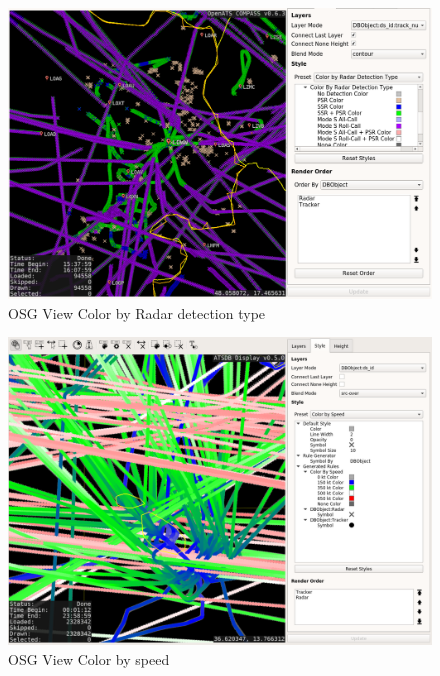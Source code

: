 \begin{figure}[H]
    \hspace*{-2.5cm}
    \includegraphics[width=19cm,frame]{figures/osgview_style_radar_detection_type.png}
  \caption{OSG View Color by Radar detection type}
\end{figure}

\begin{figure}[H]
    \hspace*{-2.5cm}
    \includegraphics[width=19cm,frame]{figures/osgview_style_speed.png}
  \caption{OSG View Color by speed}
\end{figure}

